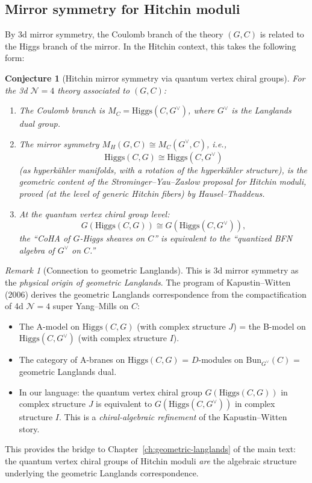 \documentclass[11pt]{article}
\newtheorem{conjecture}[theorem]{Conjecture}
\theoremstyle{definition}
\theoremstyle{remark}
\newtheorem{remark}[theorem]{Remark}
\newcommand{\Bun}{\mathrm{Bun}}
\newcommand{\Higgs}{\mathrm{Higgs}}
\newcommand{\cN}{\mathcal{N}}
\begin{document}
\subsection{Mirror symmetry for Hitchin moduli}

By 3d mirror symmetry, the Coulomb branch of the theory $(G, C)$ is related to the Higgs branch of the mirror. In the Hitchin context, this takes the following form:

\begin{conjecture}[Hitchin mirror symmetry via quantum vertex chiral groups]
\label{conj:hitchin-mirror}
For the 3d $\cN=4$ theory associated to $(G, C)$:
\begin{enumerate}[label=(\roman*)]
 \item The Coulomb branch is $M_C = \Higgs(C, G^\vee)$, where $G^\vee$ is the Langlands dual group.

 \item The mirror symmetry $M_H(G, C) \cong M_C(G^\vee, C)$, i.e.,
 \[
 \Higgs(C, G) \cong \Higgs(C, G^\vee)
 \]
 (as hyperk\"ahler manifolds, with a rotation of the hyperk\"ahler structure), is the geometric content of the Strominger--Yau--Zaslow proposal for Hitchin moduli, proved (at the level of generic Hitchin fibers) by Hausel--Thaddeus.

 \item At the quantum vertex chiral group level:
 \[
 G(\Higgs(C, G)) \cong G(\Higgs(C, G^\vee)),
 \]
 the ``CoHA of $G$-Higgs sheaves on $C$'' is equivalent to the ``quantized BFN algebra of $G^\vee$ on $C$.''
\end{enumerate}
\end{conjecture}

\begin{remark}[Connection to geometric Langlands]
\label{rem:geom-langlands}
This is 3d mirror symmetry as the \emph{physical origin of geometric Langlands}. The program of Kapustin--Witten (2006) derives the geometric Langlands correspondence from the compactification of 4d $\cN=4$ super Yang--Mills on $C$:
\begin{itemize}
 \item The A-model on $\Higgs(C, G)$ (with complex structure $J$) = the B-model on $\Higgs(C, G^\vee)$ (with complex structure $I$).
 \item The category of A-branes on $\Higgs(C, G)$ = $D$-modules on $\Bun_{G^\vee}(C)$ = geometric Langlands dual.
 \item In our language: the quantum vertex chiral group $G(\Higgs(C, G))$ in complex structure $J$ is equivalent to $G(\Higgs(C, G^\vee))$ in complex structure $I$. This is a \emph{chiral-algebraic refinement} of the Kapustin--Witten story.
\end{itemize}
This provides the bridge to Chapter~\ref*{ch:geometric-langlands} of the main text: the quantum vertex chiral groups of Hitchin moduli \emph{are} the algebraic structure underlying the geometric Langlands correspondence.
\end{remark}
\end{document}
